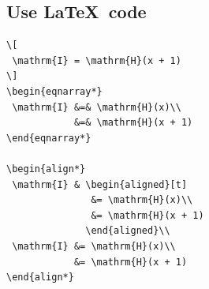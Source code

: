 \documentclass{article}
\begin{document}
\noindent
\begin{center}
 \makeatletter{}\makeatother
 \qquad
\end{center}


\subsection{Use \LaTeX{}\ code}

\begin{verbatim}
\[
 \mathrm{I} = \mathrm{H}(x + 1)
\]
\begin{eqnarray*}
 \mathrm{I} &=& \mathrm{H}(x)\\
            &=& \mathrm{H}(x + 1)
\end{eqnarray*}

\begin{align*}
 \mathrm{I} & \begin{aligned}[t]
               &= \mathrm{H}(x)\\
               &= \mathrm{H}(x + 1)
              \end{aligned}\\
 \mathrm{I} &= \mathrm{H}(x)\\
            &= \mathrm{H}(x + 1)
\end{align*}
\end{verbatim}
\end{document}
